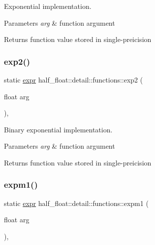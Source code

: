 Exponential implementation. 
\begin{DoxyParams}{Parameters}
{\em arg} & function argument \\
\hline
\end{DoxyParams}
\begin{DoxyReturn}{Returns}
function value stored in single-\/preicision 
\end{DoxyReturn}
\mbox{\label{structhalf__float_1_1detail_1_1functions_a4e43ae021698940af0aee27ae9026818}} 
\subsubsection{\texorpdfstring{exp2()}{exp2()}}
{\footnotesize\ttfamily static \hyperlink{structhalf__float_1_1detail_1_1expr}{expr} half\+\_\+float\+::detail\+::functions\+::exp2 (\begin{DoxyParamCaption}\item[{float}]{arg }\end{DoxyParamCaption})\hspace{0.3cm}{\ttfamily [inline]}, {\ttfamily [static]}}

Binary exponential implementation. 
\begin{DoxyParams}{Parameters}
{\em arg} & function argument \\
\hline
\end{DoxyParams}
\begin{DoxyReturn}{Returns}
function value stored in single-\/preicision 
\end{DoxyReturn}
\mbox{\label{structhalf__float_1_1detail_1_1functions_af188a99ac370d4c183b83a59cc733036}} 
\subsubsection{\texorpdfstring{expm1()}{expm1()}}
{\footnotesize\ttfamily static \hyperlink{structhalf__float_1_1detail_1_1expr}{expr} half\+\_\+float\+::detail\+::functions\+::expm1 (\begin{DoxyParamCaption}\item[{float}]{arg }\end{DoxyParamCaption})\hspace{0.3cm}{\ttfamily [inline]}, {\ttfamily [static]}}


